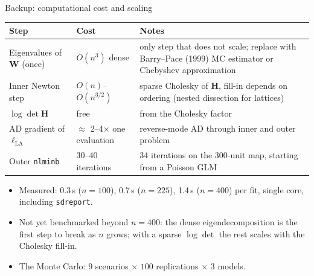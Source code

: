 \documentclass[10pt,aspectratio=169]{beamer}
\newcommand{\bW}{\mathbf{W}}
\newcommand{\bH}{\mathbf{H}}
\begin{document}
\begin{frame}{Backup: computational cost and scaling}
  \begin{center}
    \footnotesize
    \begin{tabular}{p{3.2cm} p{3cm} p{7.2cm}}
      \toprule
      Step & Cost & Notes \\
      \midrule
      Eigenvalues of $\bW$ (once) & $O(n^3)$ dense & only step that does not scale; replace with Barry--Pace (1999) MC estimator or Chebyshev approximation \\
      Inner Newton step & $O(n)$--$O(n^{3/2})$ & sparse Cholesky of $\bH$, fill-in depends on ordering (nested dissection for lattices) \\
      $\log\det\bH$ & free & from the Cholesky factor \\
      AD gradient of $\ell_{\mathrm{LA}}$ & $\approx$ 2--4$\times$ one evaluation & reverse-mode AD through inner and outer problem \\
      Outer \texttt{nlminb} & 30--40 iterations & 34 iterations on the 300-unit map, starting from a Poisson GLM \\
      \bottomrule
    \end{tabular}
  \end{center}
  \vspace{0.4em}
  \begin{itemize}
    \item Measured: 0.3\,s ($n=100$), 0.7\,s ($n=225$), 1.4\,s ($n=400$) per fit, single core, including \texttt{sdreport}.
    \item Not yet benchmarked beyond $n=400$: the dense eigendecomposition is the first step to break as $n$ grows; with a sparse $\log\det$ the rest scales with the Cholesky fill-in.
    \item The Monte Carlo: $9$ scenarios $\times$ $100$ replications $\times$ $3$ models.
  \end{itemize}
\end{frame}
\end{document}
